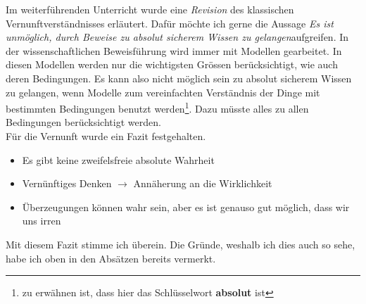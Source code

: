 Im weiterführenden Unterricht wurde eine \textit{Revision} des klassischen Vernunftverständnisses erläutert. Dafür möchte ich gerne die Aussage \glqq \textit{Es ist unmöglich, durch Beweise zu absolut sicherem Wissen zu gelangen}\grqq\;aufgreifen. In der wissenschaftlichen Beweisführung wird immer mit Modellen gearbeitet. In diesen Modellen werden nur die wichtigsten Grössen berücksichtigt, wie auch deren Bedingungen. Es kann also nicht möglich sein zu absolut sicherem Wissen zu gelangen, wenn Modelle zum vereinfachten Verständnis der Dinge mit bestimmten Bedingungen benutzt werden\footnote{zu erwähnen ist, dass hier das Schlüsselwort \textbf{absolut} ist}. Dazu müsste alles zu allen Bedingungen berücksichtigt werden.\\

Für die Vernunft wurde ein Fazit festgehalten. \\
\begin{itemize}
	\item Es gibt keine zweifelsfreie absolute Wahrheit\\
	\item Vernünftiges Denken $\rightarrow$ Annäherung an die Wirklichkeit\\
	\item Überzeugungen können wahr sein, aber es ist genauso gut möglich, dass wir uns irren\\	
\end{itemize}
Mit diesem Fazit stimme ich überein. Die Gründe, weshalb ich dies auch so sehe, habe ich oben in den Absätzen bereits vermerkt.\\